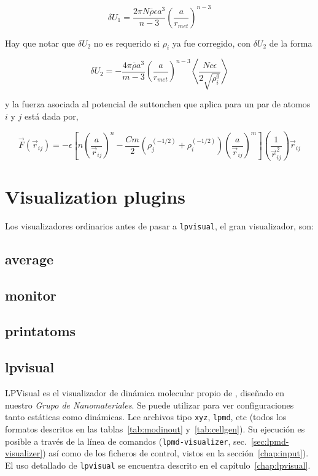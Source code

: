 $$\delta U_1 = \frac{2\pi N\overline{\rho}\epsilon
a^3}{n-3}\left(\frac{a}{r_{met}}\right)^{n-3}$$

Hay que notar que $\delta U_2$ no es requerido si $\rho_i$ ya fue corregido, con
$\delta U_2$ de la forma

$$\delta U_2 =
-\frac{4\pi\overline{\rho}a^3}{m-3}\left(\frac{a}{r_{met}}\right)^{n-3}
\left<\frac{Nc\epsilon}{2\sqrt{\rho_i^0}}\right>$$

y la fuerza asociada al potencial de suttonchen que aplica para un par de atomos
$i$ y $j$ est\'a dada por,

$$\vec{F}(\vec{r}_{ij}) = -\epsilon\left[n\left(\frac{a}{\vec{r}_{ij}}\right)^n
-
\frac{Cm}{2}(\rho_j^{(-1/2)}+\rho_i^{(-1/2)})\left(\frac{a}{\vec{r}_{ij}}
\right)^m\right]\left(\frac{1}{\vec{r}_{ij}^2}\right)\vec{r}_{ij}$$



\section{Visualization plugins}
Los visualizadores ordinarios antes de pasar a \verb|lpvisual|, el gran
visualizador, son:

\subsection {average}

\subsection {monitor}

\subsection {printatoms}

\subsection{lpvisual}

LPVisual es el visualizador de din\'amica molecular propio de {\lpmd},
dise\~nado en nuestro \emph{Grupo de Nanomateriales}. Se puede utilizar para ver
configuraciones tanto est\'aticas como din\'amicas. Lee archivos tipo {\tt xyz},
{\tt lpmd}, etc (todos los formatos descritos en las tablas~\ref{tab:modinout}
y~\ref{tab:cellgen}). Su ejecuci\'on es posible a trav\'es de la l\'inea de
comandos ({\tt lpmd-visualizer}, sec.~\ref{sec:lpmd-visualizer}) as\'i como de
los ficheros de control, vistos en la secci\'on~\ref{chap:input}). El uso
detallado de {\tt lpvisual} se encuentra descrito en el
cap\'itulo~\ref{chap:lpvisual}.


